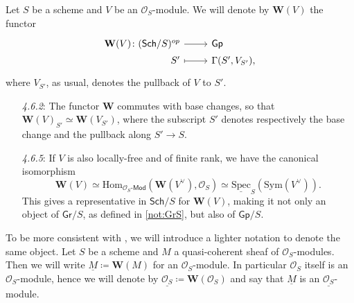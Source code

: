 \begin{defn}\label{defn:fppfSheafAssociatedtoMod}
	Let $S$ be a scheme and $V$ be an $\mathcal{O}_{ S }$-module.
	We will denote by $\mathbf{W}(V)$ the functor
	\begin{equation*}
	\begin{tikzcd}[row sep = 0ex
		,/tikz/column 1/.append style={anchor=base east}
		,/tikz/column 2/.append style={anchor=base west}]
		\mathbf{W}(V)\colon 
		(\mathsf{Sch}/S)^{op} \arrow[r, "", rightarrow] &
		\mathsf{Gp} \\
		S' \arrow[r, "", mapsto] & 
		\Gamma(S', V_{S'})
	,\end{tikzcd}
	\end{equation*} 
	where $V_{S'}$, as usual, denotes the pullback of
	$V$ to $S'$.
\end{defn}


\begin{rem}\leavevmode\vspace{-1.2\baselineskip}
\begin{enumerate}
\item[{\em 4.6.2}:]
	The functor $\mathbf{W}$ commutes with base changes,
	so that $\mathbf{W}(V)_{S'} \simeq \mathbf{W}(V_{S'})$,
	where the subscript $S'$ denotes respectively the base change 
	and the pullback along $S' \to S$.

\item[{\em 4.6.5}:]
	If $V$ is also  locally-free and of finite rank, we have the canonical isomorphism
	\begin{equation*}
		\mathbf{W}(V) \simeq
		\mathrm{Hom}_{ \mathcal{O}_{ S }\text{-}\mathsf{Mod} }
		\left(\mathbf{W}(V^\vee) , \mathcal{O}_{ S } \right) \simeq
		\underline{\mathrm{Spec}}_S(\mathrm{Sym}(V^\vee))
	.\end{equation*}
	This gives a representative in $\mathsf{Sch}/S$ for 
	$\mathbf{W}(V)$, making it not only an object of $\mathsf{Gr}/S$,
	as defined in \cref{not:GrS}, but also of $\mathsf{Gp}/S$.
\end{enumerate}
\end{rem}

\begin{ntt}\label{not:fppfOsModule}
	To be more consistent with \cite{Messing}, we will introduce a 
	lighter notation to denote the same object.
	Let $S$ be a scheme and $M$ a quasi-coherent sheaf of $\mathcal{O}_{ S }$-modules.
	Then we will write $\underline{M} \coloneqq \mathbf{W}(M)$ for
	an $\mathcal{O}_{ S }$-module.
	In particular $\mathcal{O}_{ S }$ itself is an $\mathcal{O}_{ S }$-module, hence
	we will denote by $\underline{\mathcal{O}_{ S }} \coloneqq \mathbf{W}(\mathcal{O}_{ S })$
	and say that $\underline{M}$ is an $\underline{\mathcal{O}_{ S }}$-module.
\end{ntt}


